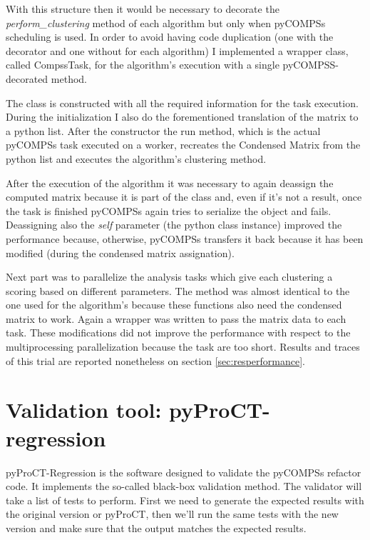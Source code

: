 With this structure then it would be necessary to decorate the \textit{perform\_clustering} method of each algorithm but only when pyCOMPSs scheduling is used. In order to avoid having code duplication (one with the decorator and one without for each algorithm) I implemented a wrapper class, called CompssTask, for the algorithm's execution with a single pyCOMPSS-decorated method.

The class is constructed with all the required information for the task execution. During the initialization I also do the forementioned translation of the matrix to a python list. After the constructor the run method, which is the actual pyCOMPSs task executed on a worker, recreates the Condensed Matrix from the python list and executes the algorithm's clustering method. 

After the execution of the algorithm it was necessary to again deassign the computed matrix because it is part of the class and, even if it's not a result, once the task is finished pyCOMPSs again tries to serialize the object and fails. Deassigning also the \textit{self} parameter (the python class instance) improved the performance because, otherwise, pyCOMPSs transfers it back because it has been modified (during the condensed matrix assignation).

Next part was to parallelize the analysis tasks which give each clustering a scoring based on different parameters. The method was almost identical to the one used for the algorithm's because these functions also need the condensed matrix to work. Again a wrapper was written to pass the matrix data to each task. These modifications did not improve the performance with respect to the multiprocessing parallelization because the task are too short. Results and traces of this trial are reported nonetheless on section \ref{sec:resperformance}.



\section{Validation tool: pyProCT-regression}
\label{sec:regression}

pyProCT-Regression is the software designed to validate the pyCOMPSs refactor code. It implements the so-called black-box validation method. The validator will take a list of tests to perform. First we need to generate the expected results with the original version or pyProCT, then we'll run the same tests with the new version and make sure that the output matches the expected results.


